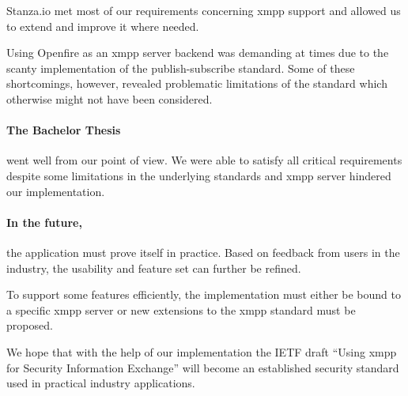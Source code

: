 Stanza.io met most of our requirements concerning \gls{xmpp} support and allowed us to extend and improve it where needed.

Using Openfire as an \gls{xmpp} server backend was demanding at times due to the scanty implementation of the \gls{publish-subscribe} standard.
Some of these shortcomings, however, revealed problematic limitations of the standard which otherwise might not have been considered.

\paragraph{The Bachelor Thesis} went well from our point of view.
We were able to satisfy all critical requirements despite some limitations in the underlying standards and \gls{xmpp} server hindered our implementation.

\paragraph{In the future,} the application must prove itself in practice.
Based on feedback from users in the industry, the usability and feature set can further be refined.

To support some features efficiently, the implementation must either be bound to a specific \gls{xmpp} server or new extensions to the \gls{xmpp} standard must be proposed.

We hope that with the help of our implementation the IETF draft ``Using \gls{xmpp} for Security Information Exchange'' will become an established security standard used in practical industry applications.
